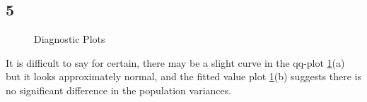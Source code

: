 \documentclass{article}
\begin{document}
    \subsection*{5}
    \begin{figure}[H]
    \centering
        \caption{Diagnostic Plots}
        \label{fig:diagnostic}
    \end{figure}
    It is difficult to say for certain, there may be a slight curve in the qq-plot \ref{fig:diagnostic}(a) but it looks approximately normal, and the fitted value plot \ref{fig:diagnostic}(b) suggests there is no significant difference in the population variances.
\end{document}
